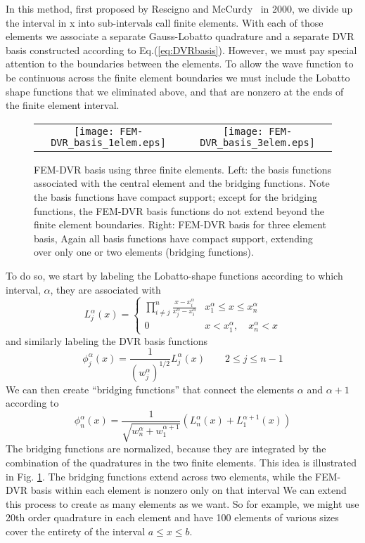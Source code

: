 \documentclass[aps,amssymb,superscriptaddress,floatfix]{revtex4}
\begin{document}
In this method, first proposed by Rescigno and McCurdy~\cite{Rescigno_McCurdy2000} in 2000, we divide up the interval in x into sub-intervals call finite elements.  With each of those elements we associate a separate Gauss-Lobatto quadrature and a separate DVR basis constructed according to Eq.(\ref{eq:DVRbasis}).   However, we must pay special attention to the boundaries between the elements.  To allow the wave function to be continuous across the finite element boundaries we must include the Lobatto shape functions that we eliminated above, and that are nonzero at the ends of the finite element interval.
\begin{figure}[h]
\begin{center}
\begin{tabular}{cc}
\texttt{[image: FEM-DVR\_basis\_1elem.eps]}&
\texttt{[image: FEM-DVR\_basis\_3elem.eps]}
\end{tabular}
\caption{FEM-DVR basis using three finite elements.  Left: the basis functions associated with the central element and the bridging functions.  Note the basis functions have compact support; except for the bridging functions, the FEM-DVR basis functions do not extend beyond the finite element boundaries.  Right: FEM-DVR basis for three element basis,  Again all basis functions have compact support, extending over only one or two elements (bridging functions).}
\label{fig:FEMDVRbasis}
\end{center}
\end{figure}

To do so, we start by labeling  the Lobatto-shape functions according to which interval, $\alpha$, they are associated with 
\begin{equation}
L_j^\alpha(x) =
\begin{cases}
 \prod_{i \ne j}^n \frac{x-x_i^\alpha}{x_j^\alpha-x_i^\alpha} & x_1^\alpha \le x \le x_n^\alpha \\
 0 & x < x_1^\alpha, \quad x_n^\alpha < x
 \end{cases}
\label{eq:FEMLobatto}
\end{equation}
and similarly labeling the DVR basis functions
\begin{equation}
\phi_j^\alpha(x) = \frac{1}{(w_j^\alpha)^{1/2}}  L_j^\alpha(x) \qquad 2 \le j \le n-1
\label{eq:FEMbasis}
\end{equation}
We can then create ``bridging functions'' that connect the elements $\alpha$ and $\alpha+1$ according to
\begin{equation}
\phi_n^\alpha(x) = \frac{1}{\sqrt{w_n^\alpha + w_1^{\alpha+1}}}\left(L_n^\alpha(x) + L_1^{\alpha+1}(x) \right)
\label{eq:FEMDVRbasis}
\end{equation}
The bridging functions are normalized, because they are integrated by the combination of the quadratures in the two finite elements.
This idea is illustrated in Fig. \ref{fig:FEMDVRbasis}.  The bridging functions extend across two elements, while the FEM-DVR basis within each element is nonzero only on that interval
We can extend this process to create as many elements as we want.  So for example, we might use 20th order quadrature in each element and have 100 elements of various sizes cover the entirety of the interval $a \le x \le b$.  
\end{document}
